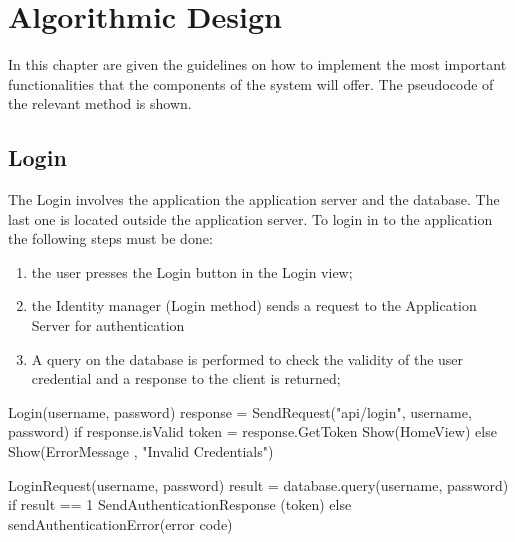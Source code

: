 \chapter{Algorithmic Design}
In this chapter are given the guidelines on how to implement the most important functionalities that the components of the system will offer. The pseudocode of the relevant method is shown. 

\section{Login}
The Login involves the application the application server and the database. The last one is located outside the application server. 
To login in to the application the following steps must be done:
\begin{enumerate}
\item the user presses the Login button in the Login view;
\item the Identity manager (Login method) sends a request to the Application Server for authentication
\item A query on the database is performed to check the validity of the user credential and a response to the client is returned;
\end{enumerate}

Login(username, password)
	response = SendRequest("api/login", username, password)
	if response.isValid 
		token = response.GetToken
		Show(HomeView)
	else
		Show(ErrorMessage , "Invalid Credentials")

LoginRequest(username, password)
	result = database.query(username, password)
	if result == 1
		SendAuthenticationResponse (token)
	else
		sendAuthenticationError(error code)
		